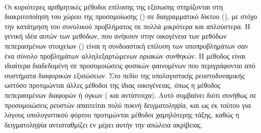 \paragraph{} Οι κυριότερες αριθμητικές μέθοδοι επίλυσης της εξίσωσης 
στηρίζονται στη διακριτοποίηση του χώρου της προσομοίωσης () σε διαγραμματικό
δίκτυο (), με στόχο την κατάτμηση του συνολικού προβλήματος σε πολλά μικρότερα
και απλούστερα. Η γενική ιδέα αυτών των μεθόδων, που ανήκουν στην οικογένεια των μεθόδων
πεπερασμένων στοιχείων () είναι η συνδυαστική επίλυση των υποπροβλημάτων σαν ένα
σύνολο προβλημάτων αλληλεξαρτώμενων οριακών συνθηκών. Η μέθοδος  είναι ιδιαίτερα
διαδεδομένη σε προσομοιώσεις φυσικών φαινομένων που περιγράφονται από συστήματα διαφορικών
εξισώσεων. Στο πεδίο της υπολογιστικής ρευστοδυναμικής ωστόσο προτιμώνται άλλες μέθοδοι
της ίδιας οικογένειας, όπως η μέθοδος πεπερασμένων διαφορών ή όγκων ( και
 αντίστοιχα). Αυτό συμβαίνει διότι συνήθως σε προσομοιώσεις ρευστών απαιτείται
πολύ πυκνή δειγματοληψία, και ως εκ τούτου για λόγους υπολογιστικού φόρτου προτιμώνται
μέθοδοι χαμηλότερης τάξης, καθώς η δειγματοληψία αντισταθμίζει εν μέρει αυτήν την απώλεια
ακρίβειας.


